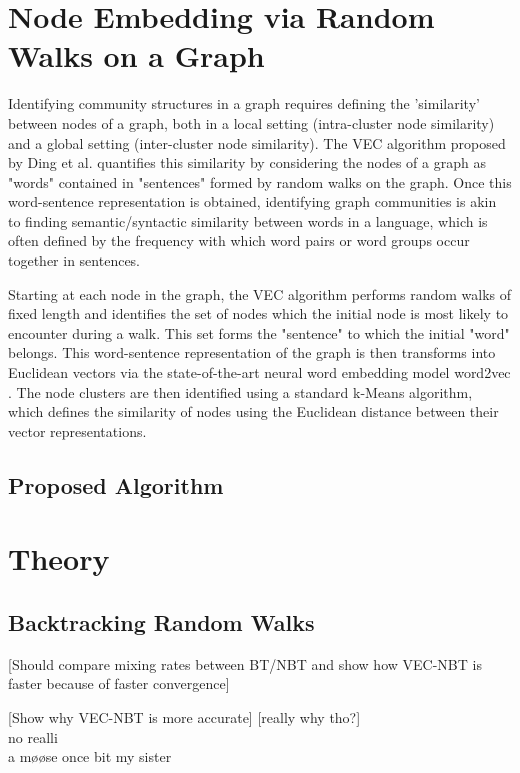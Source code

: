 \documentclass{article}
\begin{document}
\section{Node Embedding via Random Walks on a Graph}

Identifying community structures in a graph requires defining the 'similarity'
between nodes of a graph, both in a local setting (intra-cluster node
similarity) and a global setting (inter-cluster node similarity). The VEC
algorithm proposed by Ding et al. \cite{NodeEmbed} quantifies this similarity by
considering the nodes of a graph as "words" contained in "sentences" formed by
random walks on the graph. Once this word-sentence representation is obtained,
identifying graph communities is akin to finding semantic/syntactic similarity
between words in a language, which is often defined by the frequency with which
word pairs or word groups occur together in sentences.

Starting at each node in the graph, the VEC algorithm performs random walks of
fixed length and identifies the set of nodes which the initial node is most
likely to encounter during a walk. This set forms the "sentence" to which the
initial "word" belongs. This word-sentence representation of the graph is then
transforms into Euclidean vectors via the state-of-the-art neural word embedding
model word2vec \cite{word2vec}. The node clusters are then identified using a
standard k-Means algorithm, which defines the similarity of nodes using the
Euclidean distance between their vector representations.



\subsection{Proposed Algorithm}

\section{Theory}

\subsection{Backtracking Random Walks}

[Should compare mixing rates between BT/NBT and show how VEC-NBT is faster
because of faster convergence]

[Show why VEC-NBT is more accurate] [really why tho?]\\
no realli\\
a m\o\o se once bit my sister 
\end{document}
